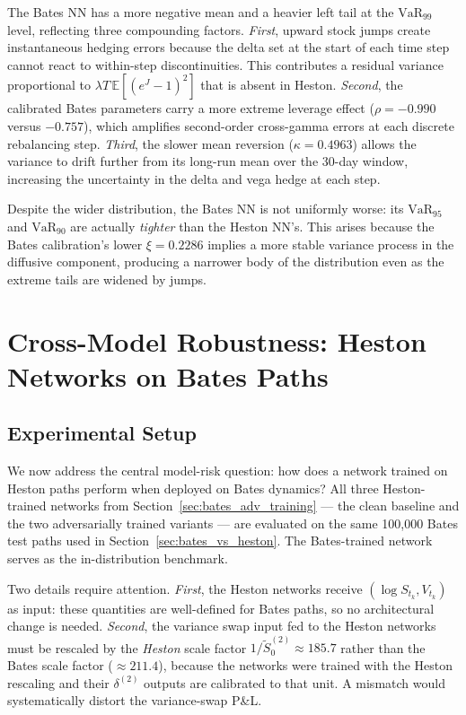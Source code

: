 The Bates NN has a more negative mean and a heavier left tail at the
$\mathrm{VaR}_{99}$ level, reflecting three compounding factors.
\emph{First}, upward stock jumps create instantaneous hedging errors
because the delta set at the start of each time step cannot react to
within-step discontinuities.  This contributes a residual variance
proportional to $\lambda T \,\mathbb{E}[(e^{J} - 1)^2]$ that is absent in
Heston.  \emph{Second}, the calibrated Bates parameters carry a more
extreme leverage effect ($\rho = -0.990$ versus $-0.757$), which amplifies
second-order cross-gamma errors at each discrete rebalancing step.
\emph{Third}, the slower mean reversion ($\kappa = 0.4963$) allows the
variance to drift further from its long-run mean over the 30-day window,
increasing the uncertainty in the delta and vega hedge at each step.

Despite the wider distribution, the Bates NN is not uniformly worse: its
$\mathrm{VaR}_{95}$ and $\mathrm{VaR}_{90}$ are actually \emph{tighter}
than the Heston NN's.  This arises because the Bates calibration's lower
$\xi = 0.2286$ implies a more stable variance process in the diffusive
component, producing a narrower body of the distribution even as the
extreme tails are widened by jumps.

\section{Cross-Model Robustness: Heston Networks on Bates Paths}
\label{sec:bates_cross_model}

\subsection{Experimental Setup}
\label{sec:bates_cross_setup}

We now address the central model-risk question: how does a network
trained on Heston paths perform when deployed on Bates dynamics?  All
three Heston-trained networks from Section~\ref{sec:bates_adv_training}
--- the clean baseline and the two adversarially trained variants ---
are evaluated on the same 100{,}000 Bates test paths used in
Section~\ref{sec:bates_vs_heston}.  The Bates-trained network serves as
the in-distribution benchmark.

Two details require attention.  \emph{First}, the Heston networks
receive $(\log S_{t_k}, V_{t_k})$ as input: these quantities are
well-defined for Bates paths, so no architectural change is needed.
\emph{Second}, the variance swap input fed to the Heston networks must
be rescaled by the \emph{Heston} scale factor $1/\widetilde{S}_0^{(2)}
\approx 185.7$ rather than the Bates scale factor ($\approx 211.4$),
because the networks were trained with the Heston rescaling and their
$\delta^{(2)}$ outputs are calibrated to that unit.  A mismatch would
systematically distort the variance-swap P\&L.

